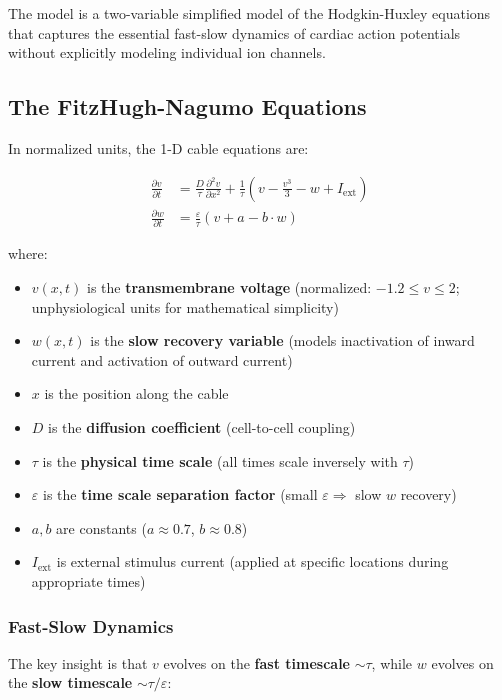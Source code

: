 \documentclass[12pt,a4paper,oneside]{book}
\begin{document}
The \fhn model is a two-variable simplified model of the Hodgkin-Huxley equations that captures the essential fast-slow dynamics of cardiac action potentials without explicitly modeling individual ion channels.

\subsection{The FitzHugh-Nagumo Equations}

In normalized units, the 1-D cable equations are:

\begin{align}
\frac{\partial v}{\partial t} &= \frac{D}{\tau} \frac{\partial^2 v}{\partial x^2} + \frac{1}{\tau} \left( v - \frac{v^3}{3} - w + I_{\text{ext}} \right) \label{eq:fhn_v}\\
\frac{\partial w}{\partial t} &= \frac{\varepsilon}{\tau} \left( v + a - b \cdot w \right) \label{eq:fhn_w}
\end{align}

where:

\begin{itemize}
    \item $v(x,t)$ is the \textbf{transmembrane voltage} (normalized: $-1.2 \le v \le 2$; unphysiological units for mathematical simplicity)
    \item $w(x,t)$ is the \textbf{slow recovery variable} (models inactivation of inward current and activation of outward current)
    \item $x$ is the position along the cable
    \item $D$ is the \textbf{diffusion coefficient} (cell-to-cell coupling)
    \item $\tau$ is the \textbf{physical time scale} (all times scale inversely with $\tau$)
    \item $\varepsilon$ is the \textbf{time scale separation factor} (small $\varepsilon \Rightarrow$ slow $w$ recovery)
    \item $a, b$ are constants ($a \approx 0.7$, $b \approx 0.8$)
    \item $I_{\text{ext}}$ is external stimulus current (applied at specific locations during appropriate times)
\end{itemize}

\subsubsection{Fast-Slow Dynamics}

The key insight is that $v$ evolves on the \textbf{fast timescale} $\sim \tau$, while $w$ evolves on the \textbf{slow timescale} $\sim \tau/\varepsilon$:
\end{document}
